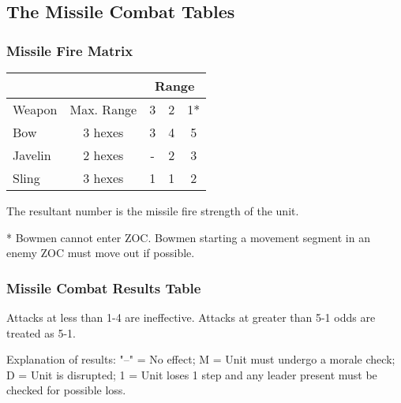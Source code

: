 \subsection{The Missile Combat Tables}
\begin{hangsubsubsection}
  \subsubsection{Missile Fire Matrix}
\end{hangsubsubsection}

{\def\arraystretch{1.2}
  \begin{tabular}{ |lcccc| }
    \hline
    & & \multicolumn{3}{c|}{ \textbf{Range}} \\
    \hline
    Weapon & Max. Range & 3 & 2 & 1* \\
    \hline
    Bow & 3 hexes & 3 & 4 & 5 \\
    Javelin & 2 hexes & - & 2 & 3 \\
    Sling & 3 hexes & 1 & 1 & 2 \\
    \hline
  \end{tabular}
}
\par
The resultant number is the missile fire strength of the unit.

* Bowmen cannot enter ZOC. Bowmen starting a movement segment in an enemy ZOC must move out if possible.

\begin{hangsubsubsection}
  \subsubsection{Missile Combat Results Table}
\end{hangsubsubsection}

{\def\arraystretch{1.2}
}
\par
Attacks at less than 1-4 are ineffective. Attacks at greater than 5-1 odds are treated as 5-1.

Explanation of results: "--" = No effect; M = Unit must undergo a morale check; D = Unit is disrupted; 1 = Unit loses 1 step and any leader present must be checked for possible loss.
